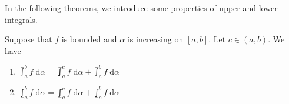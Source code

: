 \documentclass[thmcnt=section, 12pt]{my-elegantbook}
\begin{document}

In the following theorems, we introduce some properties of upper and lower integrals.

\begin{theorem}
    Suppose that $f$ is bounded and $\alpha$ is increasing on $[a, b]$. Let $c \in (a, b)$. We have
    \begin{enumerate}
        \item $\upint_a^b f \; \mathrm{d}\alpha = \upint_a^c f \; \mathrm{d}\alpha + \upint_c^b f \; \mathrm{d}\alpha$
        \item $\lowint_a^b f \; \mathrm{d}\alpha = \lowint_a^c f \; \mathrm{d}\alpha + \lowint_c^b f \; \mathrm{d}\alpha$
    \end{enumerate}
\end{theorem}
\end{document}
